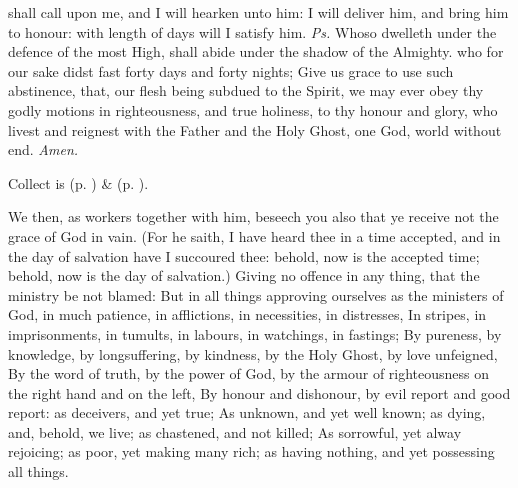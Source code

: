 \introit
{} shall call upon me, and I will hearken unto him: I will deliver him, and bring him to honour: with length of days will I satisfy him. \textit{Ps.} Whoso dwelleth under the defence of the most High, shall abide under the shadow of the Almighty.
\collect
{} who for our sake didst fast forty days and forty nights; Give us grace to use such abstinence, that, our flesh being subdued to the Spirit, we may ever obey thy godly motions in righteousness, and true holiness, to thy honour and glory, who livest and reignest with the Father and the Holy Ghost, one God, world without end. \textit{Amen.}
\begin{rubric}
     Collect is  (p. \pageref{SPSaints}) \&   (p. \pageref{SPLivingDeparted}).
\end{rubric}
 We then, as workers together with him, beseech you also that ye receive not the grace of God in vain. (For he saith, I have heard thee in a time accepted, and in the day of salvation have I succoured thee: behold, now is the accepted time; behold, now is the day of salvation.) Giving no offence in any thing, that the ministry be not blamed: But in all things approving ourselves as the ministers of God, in much patience, in afflictions, in necessities, in distresses, In stripes, in imprisonments, in tumults, in labours, in watchings, in fastings; By pureness, by knowledge, by longsuffering, by kindness, by the Holy Ghost, by love unfeigned, By the word of truth, by the power of God, by the armour of righteousness on the right hand and on the left, By honour and dishonour, by evil report and good report: as deceivers, and yet true; As unknown, and yet well known; as dying, and, behold, we live; as chastened, and not killed; As sorrowful, yet alway rejoicing; as poor, yet making many rich; as having nothing, and yet possessing all things.
